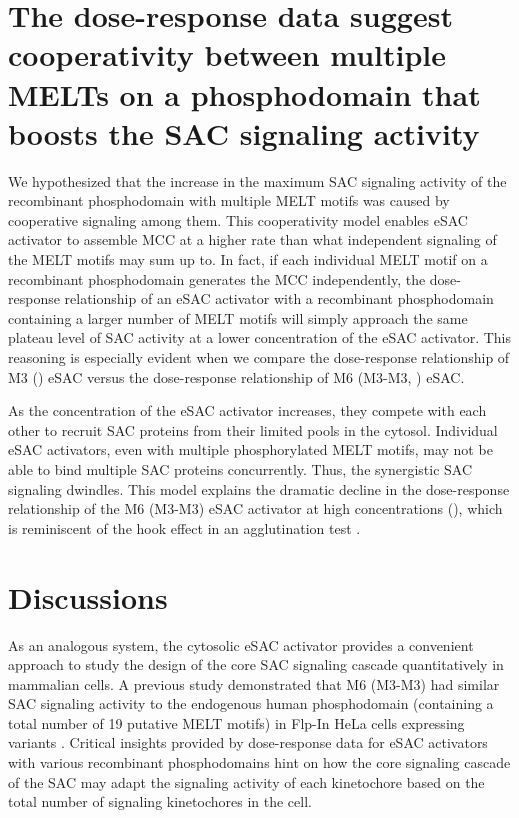 \section{The dose-response data suggest cooperativity between multiple MELTs on a  phosphodomain that boosts the SAC signaling activity}
\label{ProzoneEffectModel}

We hypothesized that the increase in the maximum SAC signaling activity of the recombinant  phosphodomain with multiple MELT motifs was caused by cooperative signaling among them. This cooperativity model enables eSAC activator to assemble MCC at a higher rate than what independent signaling of the MELT motifs may sum up to. In fact, if each individual MELT motif on a recombinant  phosphodomain generates the MCC independently, the dose-response relationship of an eSAC activator with a recombinant phosphodomain containing a larger number of MELT motifs will simply approach the same plateau level of SAC activity at a lower concentration of the eSAC activator. This reasoning is especially evident when we compare the dose-response relationship of M3 () eSAC versus the dose-response relationship of M6 (M3-M3, ) eSAC.

As the concentration of the eSAC activator increases, they compete with each other to recruit SAC proteins from their limited pools in the cytosol. Individual eSAC activators, even with multiple phosphorylated MELT motifs, may not be able to bind multiple SAC proteins concurrently. Thus, the synergistic SAC signaling dwindles. This model explains the dramatic decline in the dose-response relationship of the M6 (M3-M3) eSAC activator at high concentrations (), which is reminiscent of the hook effect in an agglutination test \cite{HenryV24}. %

\section{Discussions}
\label{eSACDiscussions}


As an analogous system, the cytosolic eSAC activator provides a convenient approach to study the design of the core SAC signaling cascade quantitatively in mammalian cells. A previous study demonstrated that M6 (M3-M3) had similar SAC signaling activity to the endogenous human  phosphodomain (containing a total number of 19 putative MELT motifs) in Flp-In\texttrademark{} HeLa cells expressing  variants \cite{RecombinantKNL1}. Critical insights provided by dose-response data for eSAC activators with various recombinant phosphodomains hint on how the core signaling cascade of the SAC may adapt the signaling activity of each kinetochore based on the total number of signaling kinetochores in the cell.

